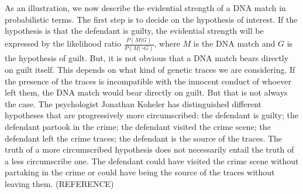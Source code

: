 \documentclass[10pt]{article}
\begin{document}
As an illustration, we now describe the evidential strength of a DNA match in probabilistic terms. The first step is to decide on the hypothesis of interest. If the hypothesis is that the defendant is guilty, the evidential strength will be expressed by the likelihood ratio
$\frac{P(M | G)}{P( M | \neg G)}$, where $M$ is the DNA match and $G$ is the hypothesis of guilt. 
But, it is not obvious that a DNA match bears directly on 
guilt itself. This depends on what kind of genetic traces we are considering. 
If the presence of the traces is incompatible 
with the innocent conduct of whoever left them, the DNA match would bear directly 
on guilt. But that is not always the case. The psychologist Jonathan Koheler has distinguished different 
hypotheses that are progressively more circumscribed: the defendant is guilty; the defendant partook in the crime; the defendant visited 
the crime scene; the defendant left the crime traces; the defendant is the source of the traces. 
The truth of a more circumscribed hypothesis does not necessarily entail the truth of a less circumscribe one. The defendant could have visited the 
crime scene without partaking in the crime or could have being the source of the traces without leaving them. (REFERENCE)
\end{document}
